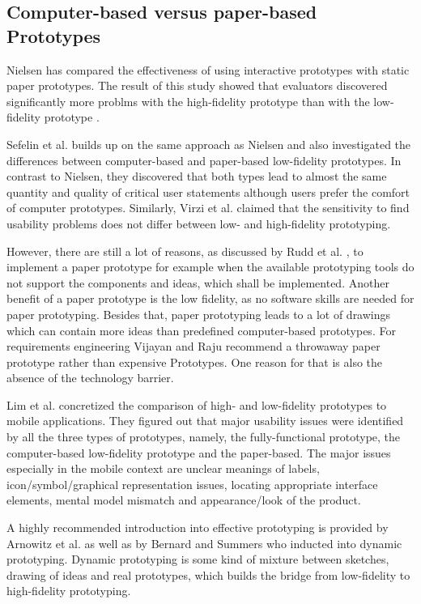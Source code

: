 \subsection{Computer-based versus paper-based Prototypes}
Nielsen \cite{nielsen1990paper} has compared the effectiveness of using interactive prototypes with static paper prototypes. The result of this study showed that evaluators discovered significantly more problms with the high-fidelity prototype than with the low-fidelity prototype .

Sefelin et al. \cite{sefelin2003paper} builds up on the same approach as Nielsen and also investigated the differences between computer-based and paper-based low-fidelity prototypes. In contrast to Nielsen, they discovered that both types lead to almost the same quantity and quality of critical user statements although users prefer the comfort of computer prototypes. Similarly, Virzi et al. \cite{virzi1996usability} claimed that the sensitivity to find usability problems does not differ between low- and high-fidelity prototyping.

However, there are still a lot of reasons, as discussed by Rudd et al. \cite{rudd1996low}, to implement a paper prototype for example when the available prototyping tools do not support the components and ideas, which shall be implemented. Another benefit of a paper prototype is the low fidelity, as no software skills are needed for paper prototyping. Besides that, paper prototyping leads to a lot of drawings which can contain more ideas than predefined computer-based prototypes. For requirements engineering Vijayan and Raju \cite{vijayan2011new} recommend a throwaway paper prototype rather than expensive Prototypes. One reason for that is also the absence of the technology barrier.

Lim et al. \cite{lim2006comparative} concretized the comparison of high- and low-fidelity prototypes to mobile applications. They figured out that major usability issues were identified by all the three types of prototypes, namely, the fully-functional prototype, the computer-based low-fidelity prototype and the paper-based. The major issues especially in the mobile context are unclear meanings of labels, icon/symbol/graphical representation issues, locating appropriate interface elements, mental model mismatch and appearance/look of the product. 

A highly recommended introduction into effective prototyping is provided by Arnowitz et al. \cite{arnowitz2010effective} as well as by Bernard and Summers \cite{bernard2010dynamic} who inducted into dynamic prototyping. Dynamic prototyping is some kind of mixture between sketches, drawing of ideas and real prototypes, which builds the bridge from low-fidelity to high-fidelity prototyping.


